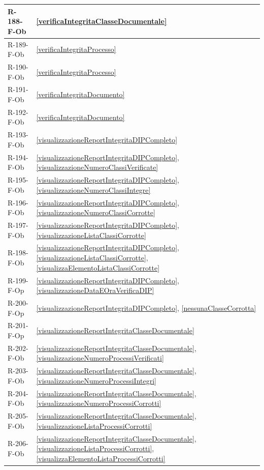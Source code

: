 \begin{longtable}{|p{4cm}|p{10cm}|}
\hline
R-188-F-Ob & \ref{verificaIntegritaClasseDocumentale} \\
\hline
R-189-F-Ob & \ref{verificaIntegritaProcesso} \\
\hline
R-190-F-Ob & \ref{verificaIntegritaProcesso} \\
\hline
R-191-F-Ob & \ref{verificaIntegritaDocumento} \\
\hline
R-192-F-Ob & \ref{verificaIntegritaDocumento} \\
\hline
R-193-F-Ob & \ref{visualizzazioneReportIntegritaDIPCompleto} \\
\hline
R-194-F-Ob & \ref{visualizzazioneReportIntegritaDIPCompleto}, \ref{visualizzazioneNumeroClassiVerificate} \\
\hline
R-195-F-Ob & \ref{visualizzazioneReportIntegritaDIPCompleto}, \ref{visualizzazioneNumeroClassiIntegre} \\
\hline
R-196-F-Ob & \ref{visualizzazioneReportIntegritaDIPCompleto}, \ref{visualizzazioneNumeroClassiCorrotte} \\
\hline
R-197-F-Ob & \ref{visualizzazioneReportIntegritaDIPCompleto}, \ref{visualizzazioneListaClassiCorrotte} \\
\hline
R-198-F-Ob & \ref{visualizzazioneReportIntegritaDIPCompleto}, \ref{visualizzazioneListaClassiCorrotte}, \ref{visualizzaElementoListaClassiCorrotte} \\
\hline
R-199-F-Op & \ref{visualizzazioneReportIntegritaDIPCompleto}, \ref{visualizzazioneDataEOraVerificaDIP} \\
\hline
R-200-F-Op & \ref{visualizzazioneReportIntegritaDIPCompleto}, \ref{nessunaClasseCorrotta} \\
\hline
R-201-F-Op & \ref{visualizzazioneReportIntegritaClasseDocumentale} \\
\hline
R-202-F-Ob & \ref{visualizzazioneReportIntegritaClasseDocumentale}, \ref{visualizzazioneNumeroProcessiVerificati} \\
\hline
R-203-F-Ob & \ref{visualizzazioneReportIntegritaClasseDocumentale}, \ref{visualizzazioneNumeroProcessiIntegri} \\
\hline
R-204-F-Ob & \ref{visualizzazioneReportIntegritaClasseDocumentale}, \ref{visualizzazioneNumeroProcessiCorrotti} \\
\hline
R-205-F-Ob & \ref{visualizzazioneReportIntegritaClasseDocumentale}, \ref{visualizzazioneListaProcessiCorrotti} \\
\hline
R-206-F-Ob & \ref{visualizzazioneReportIntegritaClasseDocumentale}, \ref{visualizzazioneListaProcessiCorrotti}, \ref{visualizzaElementoListaProcessiCorrotti} \\

\end{longtable}
